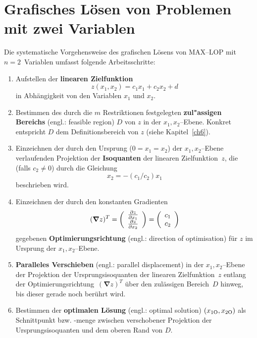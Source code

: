 \section[Grafisches L\"osen von Problemen mit zwei Variablen]%
{Grafisches L\"osen von Problemen mit zwei Variablen}
Die systematische Vorgehensweise des grafischen L\"osens von
MAX--LOP mit $n=2$~Variablen umfasst folgende Arbeitsschritte:
%
\begin{enumerate}

\item Aufstellen der {\bf linearen Zielfunktion}
%
$$
z(x_{1},x_{2})=c_{1}x_{1}+c_{2}x_{2}+d
$$
%
in Abh\"angigkeit von den Variablen $x_{1}$ und $x_{2}$.

\item Bestimmen des durch die $m$ Restriktionen
festgelegten {\bf zul"assigen Bereichs} (engl.: feasible region) 
$D$ von $z$ in der $x_{1},x_{2}$--Ebene.
Konkret entspricht $D$ dem Definitionsbereich von $z$
(siehe Kapitel~\ref{ch6}).

\item Einzeichnen der durch den Ursprung ($0=x_{1}=x_{2}$)
der $x_{1},x_{2}$--Ebene verlaufenden Projektion der
{\bf Isoquanten} der linearen Zielfunktion~$z$,
die (falls $c_{2} \neq 0$) durch die Gleichung
%
\[
x_{2} = -(c_{1}/c_{2})x_{1}
\]
%
beschrieben wird.

\item Einzeichnen der durch den konstanten Gradienten
%
$$
(\boldsymbol{\nabla} z)^{T}
=\left(\begin{array}{c}\frac{\partial z}{\partial x_{1}} \\
\frac{\partial z}{\partial x_{2}}\end{array}\right)
=\left(\begin{array}{c} c_{1} \\ c_{2}\end{array}\right)
$$
%
gegebenen {\bf Optimierungsrichtung} (engl.: direction of 
optimisation) f\"ur $z$ im Ursprung der $x_{1},x_{2}$--Ebene.

\item {\bf Paralleles Verschieben} (engl.: parallel displacement) 
in der $x_{1},x_{2}$--Ebene
der Projektion der Ursprungsisoquanten der linearen
Zielfunktion~$z$ entlang der
Optimierungsrichtung~$(\boldsymbol{\nabla} z)^{T}$ \"uber den
zul\"assigen Bereich~$D$ hinweg, bis dieser gerade noch
ber\"uhrt wird.

\item Bestimmen der {\bf optimalen L\"osung} (engl.: optimal 
solution) $(x_{1{\rm O}},
x_{2{\rm O}})$ als Schnittpunkt bzw. -menge zwischen
verschobener Projektion der Ursprungsisoquanten und dem
oberen Rand von $D$.


\end{enumerate}
